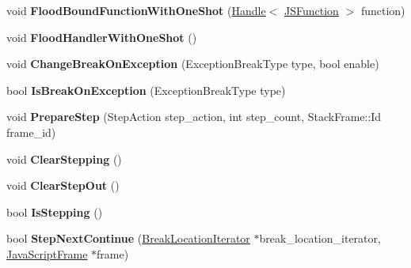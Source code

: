 \begin{DoxyCompactItemize}
\item 
\hypertarget{classv8_1_1internal_1_1_debug_a96577bbf059c8827a2f5ec48dd110e28}{}void {\bfseries Flood\+Bound\+Function\+With\+One\+Shot} (\hyperlink{classv8_1_1internal_1_1_handle}{Handle}$<$ \hyperlink{classv8_1_1internal_1_1_j_s_function}{J\+S\+Function} $>$ function)\label{classv8_1_1internal_1_1_debug_a96577bbf059c8827a2f5ec48dd110e28}

\item 
\hypertarget{classv8_1_1internal_1_1_debug_acd5192c4ea33555dbd5eaadbaccf39c5}{}void {\bfseries Flood\+Handler\+With\+One\+Shot} ()\label{classv8_1_1internal_1_1_debug_acd5192c4ea33555dbd5eaadbaccf39c5}

\item 
\hypertarget{classv8_1_1internal_1_1_debug_a7bee600841fe83a2dc539856cbfe5ec6}{}void {\bfseries Change\+Break\+On\+Exception} (Exception\+Break\+Type type, bool enable)\label{classv8_1_1internal_1_1_debug_a7bee600841fe83a2dc539856cbfe5ec6}

\item 
\hypertarget{classv8_1_1internal_1_1_debug_aea86b5daed3f01383f1a0ee2330a466e}{}bool {\bfseries Is\+Break\+On\+Exception} (Exception\+Break\+Type type)\label{classv8_1_1internal_1_1_debug_aea86b5daed3f01383f1a0ee2330a466e}

\item 
\hypertarget{classv8_1_1internal_1_1_debug_ac5fb3177ca81eed5768b98a9b39d95d6}{}void {\bfseries Prepare\+Step} (Step\+Action step\+\_\+action, int step\+\_\+count, Stack\+Frame\+::\+Id frame\+\_\+id)\label{classv8_1_1internal_1_1_debug_ac5fb3177ca81eed5768b98a9b39d95d6}

\item 
\hypertarget{classv8_1_1internal_1_1_debug_adcd9304fbc680273541c9a4d78109dab}{}void {\bfseries Clear\+Stepping} ()\label{classv8_1_1internal_1_1_debug_adcd9304fbc680273541c9a4d78109dab}

\item 
\hypertarget{classv8_1_1internal_1_1_debug_af5090ea1782837407d64a584904c11d0}{}void {\bfseries Clear\+Step\+Out} ()\label{classv8_1_1internal_1_1_debug_af5090ea1782837407d64a584904c11d0}

\item 
\hypertarget{classv8_1_1internal_1_1_debug_a45b4c696b560f085ad0cea2c340eb4c0}{}bool {\bfseries Is\+Stepping} ()\label{classv8_1_1internal_1_1_debug_a45b4c696b560f085ad0cea2c340eb4c0}

\item 
\hypertarget{classv8_1_1internal_1_1_debug_af709f1b79dbedf6a2e826dcc6fdebd89}{}bool {\bfseries Step\+Next\+Continue} (\hyperlink{classv8_1_1internal_1_1_break_location_iterator}{Break\+Location\+Iterator} $\ast$break\+\_\+location\+\_\+iterator, \hyperlink{classv8_1_1internal_1_1_java_script_frame}{Java\+Script\+Frame} $\ast$frame)\label{classv8_1_1internal_1_1_debug_af709f1b79dbedf6a2e826dcc6fdebd89}


\end{DoxyCompactItemize}
